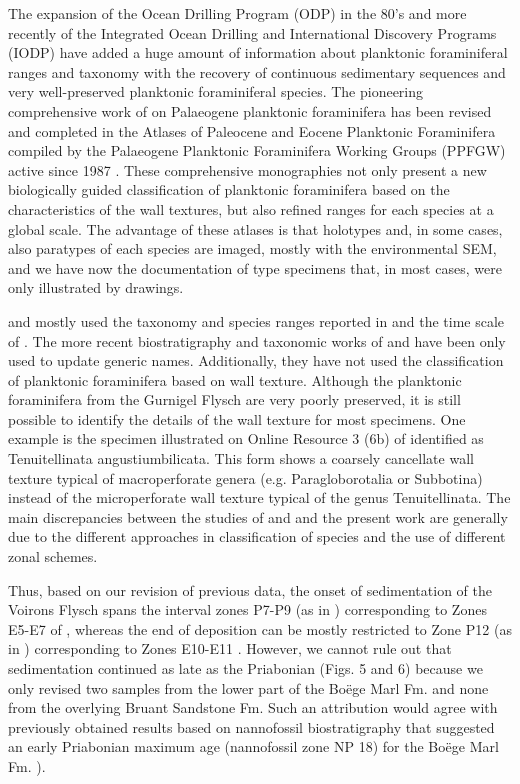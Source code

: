 \documentclass[twoside]{article}
\begin{document}
The expansion of the Ocean Drilling Program (ODP) in the 80’s and more recently of the Integrated Ocean Drilling and International Discovery Programs (IODP) have added a huge amount of information about planktonic foraminiferal ranges and taxonomy with the recovery of continuous sedimentary sequences and very well-preserved planktonic foraminiferal species. The pioneering comprehensive work of \cite{Toumarkine1985} on Palaeogene planktonic foraminifera has been revised and completed in the Atlases of Paleocene and Eocene Planktonic Foraminifera compiled by the Palaeogene Planktonic Foraminifera Working Groups (PPFGW) active since 1987 \citep{Olsson1999,Pearson2006}. These comprehensive monographies not only present a new biologically guided classification of planktonic foraminifera based on the characteristics of the wall textures, but also refined ranges for each species at a global scale. The advantage of these atlases is that holotypes and, in some cases, also paratypes of each species are imaged, mostly with the environmental SEM, and we have now the documentation of type specimens that, in most cases, were only illustrated by drawings.\par
\cite{Ospina-Ostios2013} and \cite{Ospina-Ostios2017} mostly used the taxonomy and species ranges reported in \cite{Toumarkine1985} and the time scale of \citep{Luterbacher2004}. The more recent biostratigraphy and taxonomic works of \cite{Pearson2006} and \cite{Wade2011a} have been only used to update generic names. Additionally, they have not used the classification of planktonic foraminifera based on wall texture. Although the planktonic foraminifera from the Gurnigel Flysch are very poorly preserved, it is still possible to identify the details of the wall texture for most specimens. One example is the specimen illustrated on Online Resource 3 (6b) of \cite{Ospina-Ostios2013} identified as Tenuitellinata angustiumbilicata. This form shows a coarsely cancellate wall texture typical of macroperforate genera (e.g. Paragloborotalia or Subbotina) instead of the microperforate wall texture typical of the genus Tenuitellinata. The main discrepancies between the studies of \cite{Ospina-Ostios2013} and \cite{Ospina-Ostios2017} and the present work are generally due to the different approaches in classification of species and the use of different zonal schemes.\par
Thus, based on our revision of previous data, the onset of sedimentation of the Voirons Flysch spans the interval zones P7-P9 (as in \citealp{Berggren1995a}) corresponding to Zones E5-E7 of \cite{Wade2011a}, whereas the end of deposition can be mostly restricted to Zone P12 (as in \citealp{Berggren1995a}) corresponding to Zones E10-E11 \citep{Wade2011a}. However, we cannot rule out that sedimentation continued as late as the Priabonian (Figs. 5 and 6) because we only revised two samples from the lower part of the Boëge Marl Fm. and none from the overlying Bruant Sandstone Fm. Such an attribution would agree with previously obtained results based on nannofossil biostratigraphy that suggested an early Priabonian maximum age (nannofossil zone NP 18) for the Boëge Marl Fm. \citep{JanduChene1975c,Stuijvenberg1980b}).\par
\end{document}
